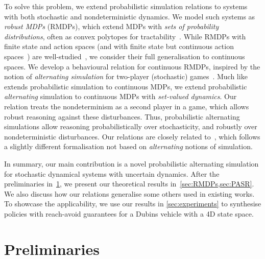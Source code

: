 \documentclass[letterpaper, 10 pt, conference]{ieeeconf}  %
\begin{document}
To solve this problem, we extend probabilistic simulation relations to systems with both stochastic and nondeterministic dynamics.
We model such systems as \emph{robust MDPs} (RMDPs), which extend MDPs with \emph{sets of probability distributions}, often as convex polytopes for tractability~\cite{DBLP:journals/ior/NilimG05,DBLP:journals/mor/WiesemannKR13}.
While RMDPs with finite state and action spaces (and with finite state but continuous action spaces~\cite{DBLP:conf/hybrid/Delimpaltadakis23}) are well-studied~\cite{DBLP:conf/aistats/PanagantiK22}, we consider their full generalisation to continuous spaces.
We develop a behavioural relation for continuous RMDPs, inspired by the notion of \emph{alternating simulation} for two-player (stochastic) games~\cite{DBLP:conf/concur/AlurHKV98,DBLP:conf/sofsem/ZhangP12}.
Much like~\cite{DBLP:journals/siamco/HaesaertSA17} extends probabilistic simulation to continuous MDPs, we extend probabilistic \emph{alternating} simulation to continuous MDPs with \emph{set-valued dynamics}.
Our relation treats the nondeterminism as a second player in a game, which allows robust reasoning against these disturbances.
Thus, probabilistic alternating simulations allow reasoning probabilistically over stochasticity, and robustly over nondeterministic disturbances.
Our relations are closely related to~\cite{DBLP:journals/automatica/ZhongLZC23}, which follows a slightly different formalisation not based on \emph{alternating} notions of simulation.

In summary, our main contribution is a novel probabilistic alternating simulation for stochastic dynamical systems with uncertain dynamics.
After the preliminaries in~\cref{sec:preliminaries}, we present our theoretical results in~\cref{sec:RMDPs,sec:PASR}.
We also discuss how our relations generalise some others used in existing works.
To showcase the applicability, we use our results in \cref{sec:experiments} to synthesise policies with reach-avoid guarantees for a Dubins vehicle with a 4D state space.

\section{Preliminaries}
\label{sec:preliminaries}
\end{document}
